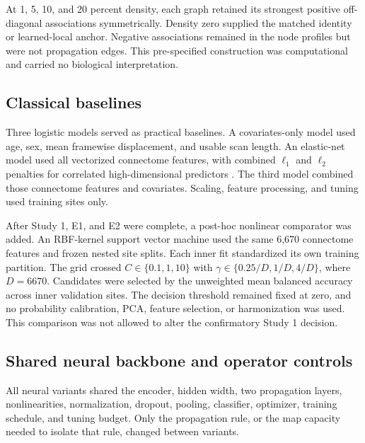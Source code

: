\documentclass[11pt,a4paper]{article}
\begin{document}
At 1, 5, 10, and 20 percent density, each graph retained its strongest positive
off-diagonal associations symmetrically. Density zero supplied the matched
identity or learned-local anchor. Negative associations remained in the node
profiles but were not propagation edges. This pre-specified construction was
computational and carried no biological interpretation.

\subsection{Classical baselines}

Three logistic models served as practical baselines. A covariates-only model
used age, sex, mean framewise displacement, and usable scan length. An
elastic-net model used all vectorized connectome features, with combined
$\ell_1$ and $\ell_2$ penalties for correlated high-dimensional predictors
\cite{zou2005elastic}. The third model combined those connectome features and
covariates. Scaling, feature processing, and tuning used training sites only.

After Study 1, E1, and E2 were complete, a post-hoc nonlinear comparator was
added. An RBF-kernel support vector machine used the same 6,670 connectome
features and frozen nested site splits. Each inner fit standardized its own
training partition. The grid crossed $C\in\{0.1,1,10\}$ with
$\gamma\in\{0.25/D,1/D,4/D\}$, where $D=6670$. Candidates were selected by
the unweighted mean balanced accuracy across inner validation sites. The
decision threshold remained fixed at zero, and no probability calibration,
PCA, feature selection, or harmonization was used. This comparison was not
allowed to alter the confirmatory Study 1 decision.

\subsection{Shared neural backbone and operator controls}

All neural variants shared the encoder, hidden width, two propagation layers,
nonlinearities, normalization, dropout, pooling, classifier, optimizer,
training schedule, and tuning budget. Only the propagation rule, or the map
capacity needed to isolate that rule, changed between variants.
\end{document}
